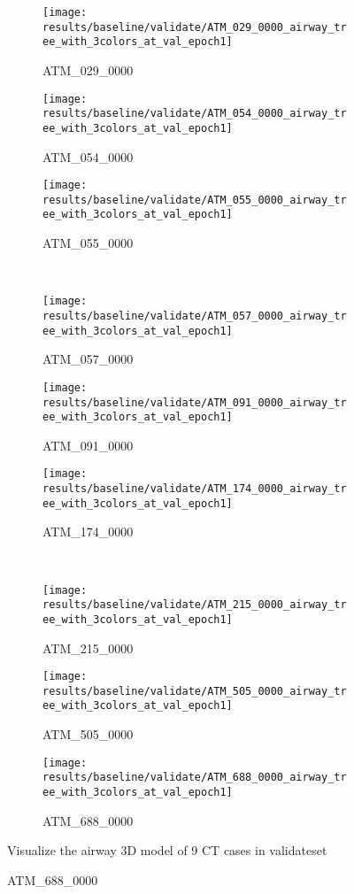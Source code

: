 \begin{figure}[!htp]
	\centering
	\begin{subfigure}{0.325\textwidth}
		\texttt{[image: results/baseline/validate/ATM\_029\_0000\_airway\_tree\_with\_3colors\_at\_val\_epoch1]}
		\caption{ATM\_029\_0000}
	\end{subfigure}
	\hfill
	\begin{subfigure}{0.325\textwidth}
		\texttt{[image: results/baseline/validate/ATM\_054\_0000\_airway\_tree\_with\_3colors\_at\_val\_epoch1]}
		\caption{ATM\_054\_0000}
	\end{subfigure}
	\hfill
	\begin{subfigure}{0.325\textwidth}
		\texttt{[image: results/baseline/validate/ATM\_055\_0000\_airway\_tree\_with\_3colors\_at\_val\_epoch1]}
		\caption{ATM\_055\_0000}
	\end{subfigure}
	\\
	\begin{subfigure}{0.325\textwidth}
		\texttt{[image: results/baseline/validate/ATM\_057\_0000\_airway\_tree\_with\_3colors\_at\_val\_epoch1]}
		\caption{ATM\_057\_0000}
	\end{subfigure}
	\hfill
	\begin{subfigure}{0.325\textwidth}
		\texttt{[image: results/baseline/validate/ATM\_091\_0000\_airway\_tree\_with\_3colors\_at\_val\_epoch1]}
		\caption{ATM\_091\_0000}
	\end{subfigure}
	\hfill
	\begin{subfigure}{0.325\textwidth}
		\texttt{[image: results/baseline/validate/ATM\_174\_0000\_airway\_tree\_with\_3colors\_at\_val\_epoch1]}
		\caption{ATM\_174\_0000}
	\end{subfigure}
	\\
	\begin{subfigure}{0.325\textwidth}
		\texttt{[image: results/baseline/validate/ATM\_215\_0000\_airway\_tree\_with\_3colors\_at\_val\_epoch1]}
		\caption{ATM\_215\_0000}
	\end{subfigure}
	\hfill
	\begin{subfigure}{0.325\textwidth}
		\texttt{[image: results/baseline/validate/ATM\_505\_0000\_airway\_tree\_with\_3colors\_at\_val\_epoch1]}
		\caption{ATM\_505\_0000}
	\end{subfigure}
	\hfill
	\begin{subfigure}{0.325\textwidth}
		\texttt{[image: results/baseline/validate/ATM\_688\_0000\_airway\_tree\_with\_3colors\_at\_val\_epoch1]}
		\caption{ATM\_688\_0000}
	\end{subfigure}
        {Visualize the airway 3D model of 9 CT cases in validateset}
	\label{fig:visualize_airway_3d_model}
\end{figure}
